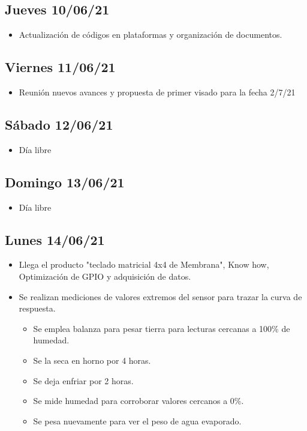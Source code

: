 \subsection*{Jueves 10/06/21}
    \begin{itemize}
        \item Actualización de códigos en plataformas y organización de documentos.
    \end{itemize}
\subsection*{Viernes 11/06/21}
    \begin{itemize}
        \item Reunión nuevos avances y propuesta de primer visado para la fecha 2/7/21 
    \end{itemize}

\subsection*{Sábado 12/06/21}
    \begin{itemize}
        \item Día libre
    \end{itemize}

\subsection*{Domingo 13/06/21}
    \begin{itemize}
        \item Día libre 
    \end{itemize}
    
\subsection*{Lunes 14/06/21}
    \begin{itemize}
        \item Llega el producto "teclado matricial 4x4 de Membrana", Know how, Optimización de GPIO y adquisición de datos. 
        \item Se realizan mediciones de valores extremos del sensor para trazar la curva de respuesta.
        \begin{itemize}
            \item Se emplea balanza para pesar tierra para lecturas cercanas a 100\% de humedad.
            \item Se la seca en horno por 4 horas.
            \item Se deja enfriar por 2 horas.
            \item Se mide humedad para corroborar valores cercanos a 0\%.
            \item Se pesa nuevamente para ver el peso de agua evaporado.
        \end{itemize}
        
    \end{itemize}
    
